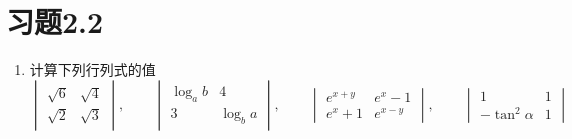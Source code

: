\section*{习题2.2}
\begin{enumerate}
    \item 计算下列行列式的值
\[\begin{vmatrix}
    \sqrt{6}&\sqrt{4}\\\sqrt{2}&\sqrt{3}
\end{vmatrix},\qquad \begin{vmatrix}
    \log_a b&4\\ 3& \log_b a
\end{vmatrix},\qquad\begin{vmatrix}
    e^{x+y}&e^x-1\\e^x+1&e^{x-y}
\end{vmatrix},\qquad\begin{vmatrix}
    1&1\\-\tan^2\alpha&1
\end{vmatrix}\]


\end{enumerate}
